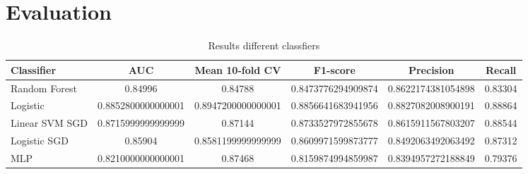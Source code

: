 \section{Evaluation}

\begin{table*}
    \centering
    \caption{Results different classfiers\label{tab:classifier-comp}}
    \begin{tabular}{l | S[table-format=1.3] | S[table-format=1.3] | S[table-format=1.3] | S[table-format=1.3] | S[table-format=1.3]}
    \hline
    Classifier & {AUC} & {Mean 10-fold CV} & {F1-score} & {Precision} & {Recall} \\
    \hline
    Random Forest & 0.84996 & 0.84788 & 0.8473776294909874 & 0.8622174381054898 & 0.83304 \\
    Logistic & 0.8852800000000001 & 0.8947200000000001 & 0.8856641683941956 & 0.8827082008900191 & 0.88864 \\
    Linear SVM SGD & 0.8715999999999999 & 0.87144 & 0.8733527972855678 & 0.8615911567803207 & 0.88544 \\
    Logistic SGD & 0.85904 & 0.8581199999999999 & 0.8609971599873777 & 0.8492063492063492 & 0.87312 \\
    MLP & 0.8210000000000001 & 0.87468 & 0.8159874994859987 & 0.8394957272188849 & 0.79376 \\
    \hline
    \end{tabular}
\end{table*}